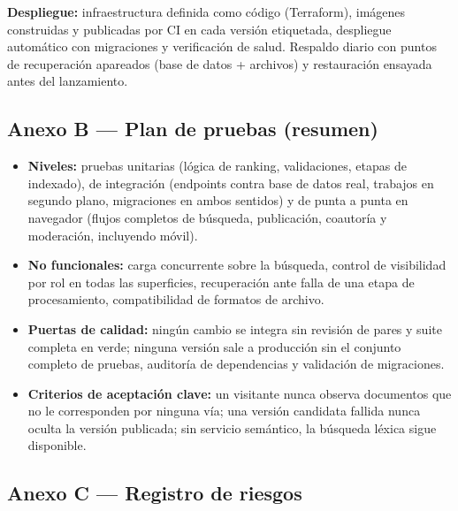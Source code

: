 \documentclass[12pt,a4paper]{article}
\begin{document}
\noindent\textbf{Despliegue:} infraestructura definida como código (Terraform), imágenes construidas y publicadas por CI en cada versión etiquetada, despliegue automático con migraciones y verificación de salud. Respaldo diario con puntos de recuperación apareados (base de datos + archivos) y restauración ensayada antes del lanzamiento.

\subsection*{Anexo B — Plan de pruebas (resumen)}

\begin{itemize}
  \item \textbf{Niveles:} pruebas unitarias (lógica de ranking, validaciones, etapas de indexado), de integración (endpoints contra base de datos real, trabajos en segundo plano, migraciones en ambos sentidos) y de punta a punta en navegador (flujos completos de búsqueda, publicación, coautoría y moderación, incluyendo móvil).
  \item \textbf{No funcionales:} carga concurrente sobre la búsqueda, control de visibilidad por rol en todas las superficies, recuperación ante falla de una etapa de procesamiento, compatibilidad de formatos de archivo.
  \item \textbf{Puertas de calidad:} ningún cambio se integra sin revisión de pares y suite completa en verde; ninguna versión sale a producción sin el conjunto completo de pruebas, auditoría de dependencias y validación de migraciones.
  \item \textbf{Criterios de aceptación clave:} un visitante nunca observa documentos que no le corresponden por ninguna vía; una versión candidata fallida nunca oculta la versión publicada; sin servicio semántico, la búsqueda léxica sigue disponible.
\end{itemize}

\subsection*{Anexo C — Registro de riesgos}
\end{document}
